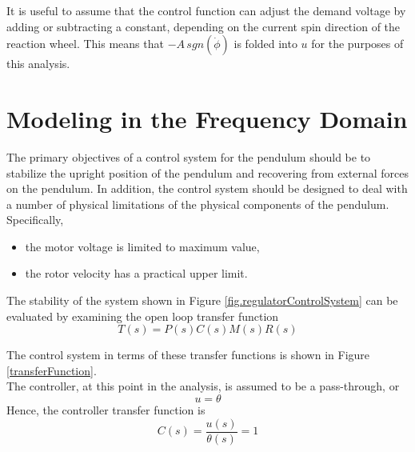 \documentclass[12pt,letterpaper]{article}
\begin{document}
It is useful to assume that the control function can adjust the demand voltage by adding or subtracting a constant, depending on the current spin direction of the reaction wheel.  This means that $-A\,sgn(\dot{\phi})$ is folded
into $u$ for the purposes of this analysis.  









\section{Modeling in the Frequency Domain}
\label{sec:Modeling}

The primary objectives of a control system for the pendulum should be to stabilize the upright position of the pendulum and recovering from external forces on the pendulum.  In addition, the control system should be designed to deal with a number
of physical limitations of the physical components of the pendulum.  Specifically,
\begin{itemize}
    \item the motor voltage is limited to maximum value,
    \item the rotor velocity has a practical upper limit.
\end{itemize}


The stability of the system shown in Figure  \ref{fig.regulatorControlSystem} can be evaluated by examining the
open loop transfer function
\begin{equation}
    T(s) = P(s) C(s) M(s) R(s)
\end{equation}



The control system in terms of these transfer functions is shown in Figure \ref{transferFunction}.\\


The controller, at this point in the analysis, is assumed to be a pass-through, or
%
\begin{equation}
u = \theta
\end{equation}
Hence, the controller transfer function is
\begin{equation}
C(s) = \frac{u(s)}{\theta(s)} = 1
    \label{EQ.simpleController}
\end{equation}
\end{document}
